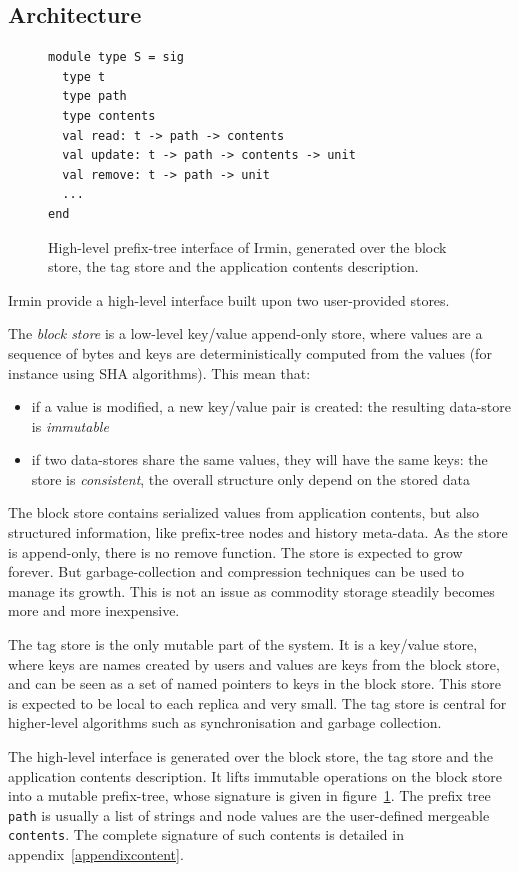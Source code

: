 \documentclass{article}
\renewcommand{\-}{\hyp}
\newcommand{\irmin}{Irmin\xspace}
\newcommand{\code}[1]{\texttt{#1}}
\begin{document}
\subsection{Architecture}

\begin{figure}[hbt]
\begin{lstlisting}
module type S = sig
  type t
  type path
  type contents
  val read: t -> path -> contents
  val update: t -> path -> contents -> unit
  val remove: t -> path -> unit
  ...
end
\end{lstlisting}
\caption{High-level prefix-tree interface of \irmin, generated over the block store, the tag store and the application contents description.}
\label{prefixtreesig}
\end{figure}

\irmin provide a high-level interface built upon two user-provided stores.

The \emph{block store} is a low-level key/value append-only store, where values are a sequence of bytes and keys are deterministically computed from the values (for instance using SHA algorithms).
This mean that:
\begin{itemize}
	\item if a value is modified, a new key/value pair is created: the resulting data-store is \emph{immutable}
	\item if two data-stores share the same values, they will have the same keys: the store is \emph{consistent}, the overall structure only depend on the stored data
\end{itemize}
The block store contains serialized values from application contents, but also structured information, like prefix-tree nodes and history meta-data.
As the store is append-only, there is no remove function.
The store is expected to grow forever.
But garbage-collection and compression techniques can be used to manage its growth.
This is not an issue as commodity storage steadily becomes more and more inexpensive.

The tag store is the only mutable part of the system.
It is a key/value store, where keys are names created by users and values are keys from the block store, and can be seen as a set of named pointers to keys in the block store.
This store is expected to be local to each replica and very small.
The tag store is central for higher-level algorithms such as synchronisation and garbage collection.

The high-level interface is generated over the block store, the tag store and the application contents description.
It lifts immutable operations on the block store into a mutable prefix-tree, whose signature is given in figure~\ref{prefixtreesig}.
The prefix tree \code{path} is usually a list of strings and node values are the user-defined mergeable \code{contents}.
The complete signature of such contents is detailed in appendix~\ref{appendixcontent}.
\end{document}
